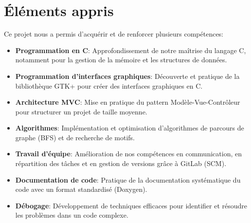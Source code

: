 \section{Éléments appris}\label{apprentissages}

Ce projet nous a permis d'acquérir et de renforcer plusieurs compétences:

\begin{itemize}
    \item \textbf{Programmation en C}: Approfondissement de notre maîtrise du langage C, notamment pour la gestion de la mémoire et les structures de données.
    
    \item \textbf{Programmation d'interfaces graphiques}: Découverte et pratique de la bibliothèque GTK+ pour créer des interfaces graphiques en C.
    
    \item \textbf{Architecture MVC}: Mise en pratique du pattern Modèle-Vue-Contrôleur pour structurer un projet de taille moyenne.
    
    \item \textbf{Algorithmes}: Implémentation et optimisation d'algorithmes de parcours de graphe (BFS) et de recherche de motifs.
    
    \item \textbf{Travail d'équipe}: Amélioration de nos compétences en communication, en répartition des tâches et en gestion de versions grâce à GitLab (SCM).
    
    \item \textbf{Documentation de code}: Pratique de la documentation systématique du code avec un format standardisé (Doxygen).
    
    \item \textbf{Débogage}: Développement de techniques efficaces pour identifier et résoudre les problèmes dans un code complexe.
\end{itemize}